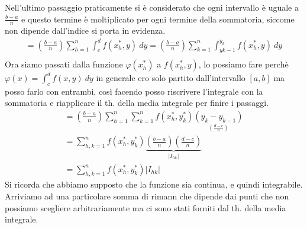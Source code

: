 \documentclass[a4paper, oneside]{article}
\begin{document}
Nell'ultimo passaggio praticamente si è considerato che ogni intervallo è uguale a $\frac{b-a}{n}$ e questo termine è moltiplicato per ogni termine della sommatoria, siccome non dipende dall'indice si porta   in evidenza.
\begin{gather*}
    = \left(\frac{b-a}{n}\right) \sum_{h=1}^{n} \int_{c}^{d} f(x_h^* , y) \ dy = \left(\frac{b-a}{n}\right) \sum_{k=1}^{n} \int_{y{k-1}}^{y_k} f(x_h^*,y) \ dy\\
\end{gather*}
Ora siamo passati dalla funzione $\varphi(x^*_h)$ a $f(x^*_h,y)$, lo possiamo fare perchè $\varphi(x) = \int_{c}^{d} f(x,y) \ dy$ in generale ero solo partito dall'intervallo $[a,b]$ ma posso farlo con entrambi, così facendo posso riscrivere l'integrale con la sommatoria e riapplicare il th. della media integrale per finire i passaggi.
\begin{gather*}
    = \left(\frac{b-a}{n}\right) \sum_{h=1}^{n} \sum_{k=1}^{n} f(x_h^*,y_k^*) \underset{\left(\frac{d-c}{n}\right)}{\left(y_k - y_{k-1}\right) } \\
    = \sum_{h,k = 1}^{n} f(x_h^*,y_k^*) \underbrace{\left(\frac{b-a}{n}\right)\left(\frac{d-c}{n}\right)}_{\left\lvert I_{hk} \right\rvert }\\
    = \sum_{h,k=1}^n f(x_h^*,y_k^*) |I_{hk}| 
    \end{gather*}
Si ricorda che abbiamo supposto che la funzione sia continua, e quindi integrabile. Arriviamo ad una particolare somma di rimann che dipende dai punti che non possiamo scegliere arbitrariamente ma ci sono stati forniti dal th. della media integrale.\\
\end{document}
